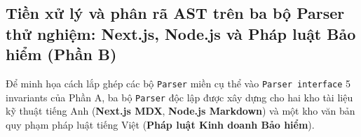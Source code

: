 \subsection{Tiền xử lý và phân rã AST trên ba bộ Parser thử nghiệm: Next.js, Node.js và Pháp luật Bảo hiểm (Phần B)}
Để minh họa cách lắp ghép các bộ \texttt{Parser} miền cụ thể vào \texttt{Parser interface} 5 invariants của Phần A, ba bộ \texttt{Parser} độc lập được xây dựng cho hai kho tài liệu kỹ thuật tiếng Anh (\textbf{Next.js MDX}, \textbf{Node.js Markdown}) và một kho văn bản quy phạm pháp luật tiếng Việt (\textbf{Pháp luật Kinh doanh Bảo hiểm}).

